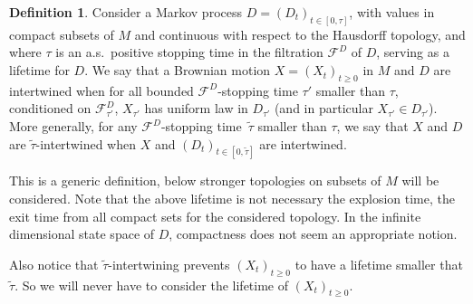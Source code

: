 \documentclass[JEP,XML,SOM,Unicode,NoFloatCountersInSection,published]{cedram}
\theoremstyle{plain}
\theoremstyle{definition}
\newtheorem{definition}[thm]{Definition}
\newcommand{\SF}{{\mathscr F}}
\let\wi\widetilde
\begin{document}
\begin{definition}
\label{D6.0}
Consider a Markov process $D=(D_t)_{t\in[0,\tau]}$, with values in compact subsets of $M$ and continuous with respect to the Hausdorff topology,
and where $\tau$ is an a.s.\ positive stopping time in the filtration $\SF^D$ of $D$, serving as a lifetime for $D$.
We say that a Brownian motion $X=(X_t)_{t\geq 0}$ in $M$ and $D$ are intertwined when for all bounded $\SF^D$-stopping time $\tau'$ smaller than $\tau$, {conditioned on} $\SF_{\tau'}^D$, $X_{\tau'}$ has uniform law in $D_{\tau'}$ (and in particular $X_{\tau'}\in {D}_{\tau'}$).
More generally, for any $\SF^D$-stopping time~$\wi\tau$ smaller than $\tau$,
we say that $X$ and $D$ are $\wi\tau$-intertwined when $X$ and $(D_t)_{t\in[0,\wi\tau]}$ are intertwined.
\end{definition}
This is a generic definition, below stronger topologies on subsets of $M$ will be considered. Note that the above lifetime is not necessary the explosion time, \ie the exit time from all compact sets for the considered topology. In the infinite dimensional state space of $D$, compactness does not seem an appropriate notion.

Also notice that $\wi\tau$-intertwining prevents $(X_t)_{t\geq 0}$ to have a lifetime smaller that $\wi\tau$. So we will never have to consider the lifetime of $(X_t)_{t\geq 0}$.
\end{document}

